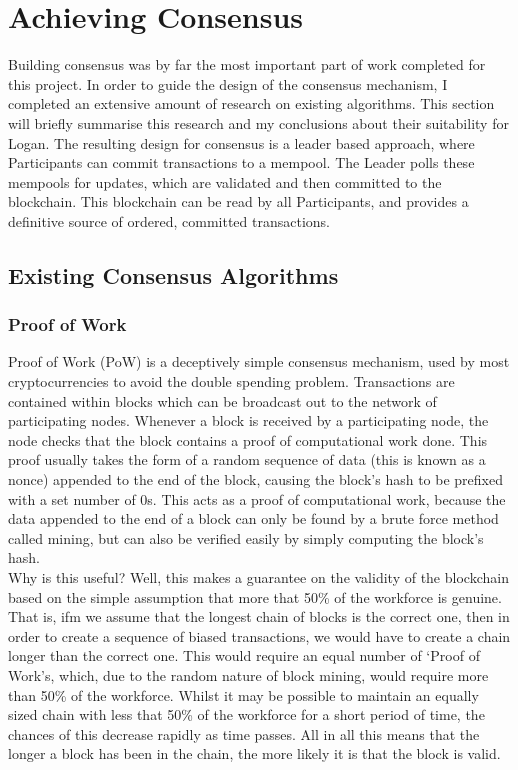 \documentclass[12pt,a4paper,twoside,openright]{report}
\begin{document}
	\section{Achieving Consensus}\label{sec:consensus}
	Building consensus was by far the most important part of work completed for this project. 
	In order to guide the design of the consensus mechanism, I completed an extensive amount of research on existing algorithms.
	This section will briefly summarise this research and my conclusions about their suitability for Logan. 
	The resulting design for consensus is a leader based approach, where Participants can commit transactions to a mempool.
	The Leader polls these mempools for updates, which are validated and then committed to the blockchain.
	This blockchain can be read by all Participants, and provides a definitive source of ordered, committed transactions.

	\subsection{Existing Consensus Algorithms}
	\subsubsection*{Proof of Work}
	Proof of Work (PoW) is a deceptively simple consensus mechanism, used by most cryptocurrencies to avoid the double spending problem.
	Transactions are contained within blocks which can be broadcast out to the network of participating nodes. 
	Whenever a block is received by a participating node, the node checks that the block contains a proof of computational work done. 
	This proof usually takes the form of a random sequence of data (this is known as a nonce) appended to the end of the block, causing the block's hash to be prefixed with a set number of 0s.
	This acts as a proof of computational work, because the data appended to the end of a block can only be found by a brute force method called mining, but can also be verified easily by simply computing the block's hash.\\
	
	Why is this useful? 
	Well, this makes a guarantee on the validity of the blockchain based on the simple assumption that more that 50\% of the workforce is genuine.
	That is, ifm we assume that the longest chain of blocks is the correct one, then in order to create a sequence of biased transactions, we would have to create a chain longer than the correct one. 
	This would require an equal number of `Proof of Work's, which, due to the random nature of block mining, would require more than 50\% of the workforce.
	Whilst it may be possible to maintain an equally sized chain with less that 50\% of the workforce for a short period of time, the chances of this decrease rapidly as time passes.
	All in all this means that the longer a block has been in the chain, the more likely it is that the block is valid.\\
\end{document}
